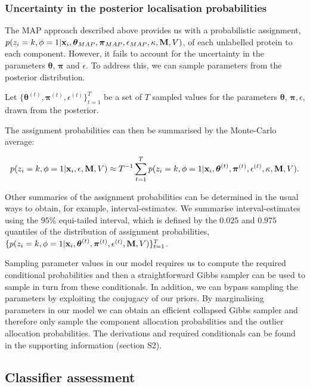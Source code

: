 \documentclass[10pt,letterpaper]{article}\usepackage[]{graphicx}\usepackage[]{color}
\begin{document}
\subsubsection*{Uncertainty in the posterior localisation probabilities}\label{section::MCMC}

The MAP approach described above provides us with a probabilistic
assignment,
$p(z_i = k, \phi = 1 | {\bf x}_i, \boldsymbol{\theta}_{MAP},
\boldsymbol{\pi}_{MAP} , \epsilon_{MAP},\kappa, {\bf M}, V)$, of each
unlabelled protein to each component.  However, it fails to account
for the uncertainty in the parameters $\boldsymbol{\theta}$,
$\boldsymbol{\pi}$ and $\epsilon$. To address this, we can sample
parameters from the posterior distribution.

Let
$\{\boldsymbol{\theta}^{(t)}, \boldsymbol{\pi}^{(t)},
\epsilon^{(t)}\}_{t=1}^T$ be a set of $T$ sampled values for the
parameters $\boldsymbol{\theta}$, $\boldsymbol{\pi}, \epsilon$, drawn
from the posterior.


The assignment probabilities can then be summarised by the Monte-Carlo
average:

\[p(z_i = k, \phi = 1 | {\bf x}_i, \epsilon, {\bf M}, V) \approx T^{-1}\sum_{t=1}^{T}p(z_i = k, \phi = 1 | {\bf x}_i, \boldsymbol{\theta}^{(t)}, \boldsymbol{\pi}^{(t)} , \epsilon^{(t)}, \kappa, {\bf M}, V).\]

Other summaries of the assignment probabilities can be determined in
the usual ways to obtain, for example, interval-estimates. We
summarise interval-estimates using the $95\%$ equi-tailed interval,
which is defined by the $0.025$ and $0.975$ quantiles of the
distribution of assignment probabilities,
$\{p(z_i = k, \phi = 1 | {\bf x}_i, \boldsymbol{\theta}^{(t)},
\boldsymbol{\pi}^{(t)} , \epsilon^{(t)}, {\bf M}, V) \}_{t=1}^T$.

Sampling parameter values in our model requires us to compute the
required conditional probabilities and then a straightforward Gibbs
sampler can be used to sample in turn from these conditionals. In
addition, we can bypass sampling the parameters by exploiting the
conjugacy of our priors. By marginalising parameters in our model we
can obtain an efficient collapsed Gibbs sampler and therefore only
sample the component allocation probabilities and the outlier
allocation probabilities. The derivations and required conditionals
can be found in the supporting information (section S2).

\subsection*{Classifier assessment}\label{section::assessment}
\end{document}
